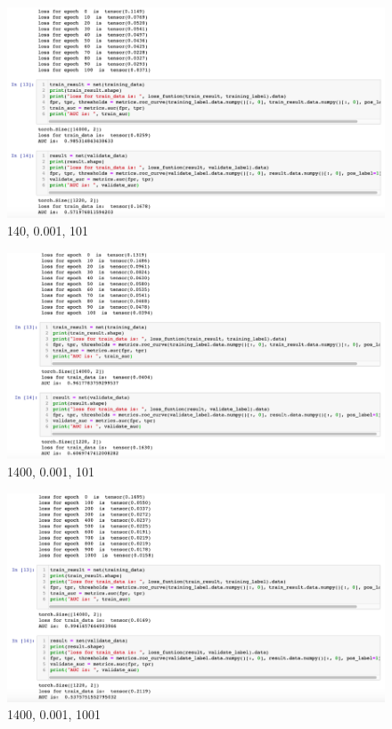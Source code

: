 \documentclass{article}
\begin{document}
\begin{figure}[h]
  \centering
  \includegraphics[width=1.0\textwidth]{img/Picture 11}
  \caption{140, 0.001, 101}
\end{figure}

\begin{figure}[h]
  \centering
  \includegraphics[width=1.0\textwidth]{img/Picture 12}
  \caption{1400, 0.001, 101}
\end{figure}

\begin{figure}[h]
  \centering
  \includegraphics[width=1.0\textwidth]{img/Picture 13}
  \caption{1400, 0.001, 1001}
\end{figure}
\end{document}
